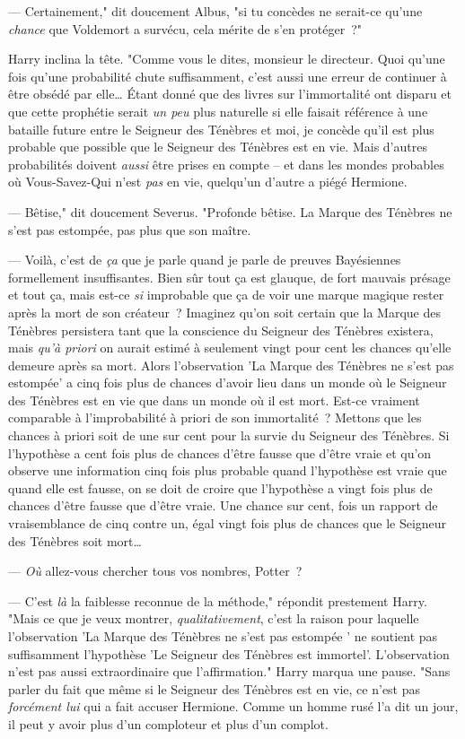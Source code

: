--- Certainement," dit doucement Albus, "si tu concèdes ne serait-ce qu'une \emph{chance} que Voldemort a survécu, cela mérite de s'en protéger~?"

Harry inclina la tête. "Comme vous le dites, monsieur le directeur. Quoi qu'une fois qu'une probabilité chute suffisamment, c'est aussi une erreur de continuer à être obsédé par elle… Étant donné que des livres sur l'immortalité ont disparu et que cette prophétie serait \emph{un peu} plus naturelle si elle faisait référence à une bataille future entre le Seigneur des Ténèbres et moi, je concède qu'il est plus probable que possible que le Seigneur des Ténèbres est en vie. Mais d'autres probabilités doivent \emph{aussi} être prises en compte -- et dans les mondes probables où Vous-Savez-Qui n'est \emph{pas} en vie, quelqu'un d'autre a piégé Hermione.

--- Bêtise," dit doucement Severus. "Profonde bêtise. La Marque des Ténèbres ne s'est pas estompée, pas plus que son maître.

--- Voilà, c'est de \emph{ça} que je parle quand je parle de preuves Bayésiennes formellement insuffisantes. Bien sûr tout ça est glauque, de fort mauvais présage et tout ça, mais est-ce \emph{si} improbable que ça de voir une marque magique rester après la mort de son créateur~? Imaginez qu'on soit certain que la Marque des Ténèbres persistera tant que la conscience du Seigneur des Ténèbres existera, mais \emph{qu'à priori} on aurait estimé à seulement vingt pour cent les chances qu'elle demeure après sa mort. Alors l'observation 'La Marque des Ténèbres ne s'est pas estompée' a cinq fois plus de chances d'avoir lieu dans un monde où le Seigneur des Ténèbres est en vie que dans un monde où il est mort. Est-ce vraiment comparable à l'improbabilité à priori de son immortalité~? Mettons que les chances à priori soit de une sur cent pour la survie du Seigneur des Ténèbres. Si l'hypothèse a cent fois plus de chances d'être fausse que d'être vraie et qu'on observe une information cinq fois plus probable quand l'hypothèse est vraie que quand elle est fausse, on se doit de croire que l'hypothèse a vingt fois plus de chances d'être fausse que d'être vraie. Une chance sur cent, fois un rapport de vraisemblance de cinq contre un, égal vingt fois plus de chances que le Seigneur des Ténèbres soit mort…

--- \emph{Où} allez-vous chercher tous vos nombres, Potter~?

--- C'est \emph{là} la faiblesse reconnue de la méthode," répondit prestement Harry. "Mais ce que je veux montrer, \emph{qualitativement}, c'est la raison pour laquelle l'observation 'La Marque des Ténèbres ne s'est pas estompée ' ne soutient pas suffisamment l'hypothèse 'Le Seigneur des Ténèbres est immortel'. L'observation n'est pas aussi extraordinaire que l'affirmation." Harry marqua une pause. "Sans parler du fait que même si le Seigneur des Ténèbres est en vie, ce n'est pas \emph{forcément lui} qui a fait accuser Hermione. Comme un homme rusé l'a dit un jour, il peut y avoir plus d'un comploteur et plus d'un complot.

